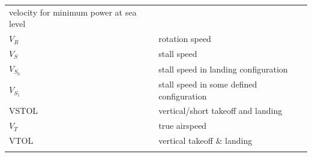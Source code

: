 \documentclass[
]{book}
\begin{document}
\begin{longtable}[]{@{}ll@{}}
\begin{minipage}[t]{0.47\columnwidth}
velocity for minimum power at sea level\strut
\end{minipage}\tabularnewline
\begin{minipage}[t]{0.47\columnwidth}\raggedright
\(V_R\)\strut
\end{minipage} & \begin{minipage}[t]{0.47\columnwidth}\raggedright
rotation speed\strut
\end{minipage}\tabularnewline
\begin{minipage}[t]{0.47\columnwidth}\raggedright
\(V_S\)\strut
\end{minipage} & \begin{minipage}[t]{0.47\columnwidth}\raggedright
stall speed\strut
\end{minipage}\tabularnewline
\begin{minipage}[t]{0.47\columnwidth}\raggedright
\(V_{S_0}\)\strut
\end{minipage} & \begin{minipage}[t]{0.47\columnwidth}\raggedright
stall speed in landing configuration\strut
\end{minipage}\tabularnewline
\begin{minipage}[t]{0.47\columnwidth}\raggedright
\(V_{S_1}\)\strut
\end{minipage} & \begin{minipage}[t]{0.47\columnwidth}\raggedright
stall speed in some defined configuration\strut
\end{minipage}\tabularnewline
\begin{minipage}[t]{0.47\columnwidth}\raggedright
VSTOL\strut
\end{minipage} & \begin{minipage}[t]{0.47\columnwidth}\raggedright
vertical/short takeoff and landing\strut
\end{minipage}\tabularnewline
\begin{minipage}[t]{0.47\columnwidth}\raggedright
\(V_T\)\strut
\end{minipage} & \begin{minipage}[t]{0.47\columnwidth}\raggedright
true airspeed\strut
\end{minipage}\tabularnewline
\begin{minipage}[t]{0.47\columnwidth}\raggedright
VTOL\strut
\end{minipage} & \begin{minipage}[t]{0.47\columnwidth}\raggedright
vertical takeoff \& landing\strut
\end{minipage}\tabularnewline
\begin{minipage}[t]{0.47\columnwidth}\raggedright

\end{minipage}
\end{longtable}
\end{document}
